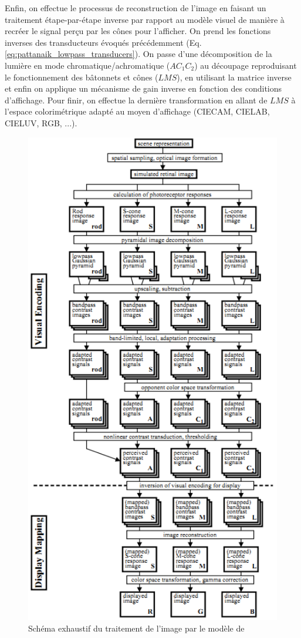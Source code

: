 	\par Enfin, on effectue le processus de reconstruction de l'image en faisant un traitement étape-par-étape inverse par rapport au modèle visuel de manière à recréer le signal perçu par les cônes pour l'afficher. On prend les fonctions inverses des transducteurs évoqués précédemment (Eq. \ref{eq:pattanaik_lowpass_transducers}). On passe d'une décomposition de la lumière en mode chromatique/achromatique ($AC_1C_2$) au découpage reproduisant le fonctionnement des bâtonnets et cônes ($LMS$), en utilisant la matrice inverse et enfin on applique un mécanisme de gain inverse en fonction des conditions d'affichage. Pour finir, on effectue la dernière transformation en allant de $LMS$ à l'espace colorimétrique adapté au moyen d'affichage (CIECAM, CIELAB, CIELUV, RGB, ...).
	
	\begin{figure}[h]
		\centering
		\includegraphics[scale=1.25]{Figures/PattanaikFullModel}
		\caption{Schéma exhaustif du traitement de l'image par le modèle de \cite{pattanaik_multiscale_1998}}
		\label{fig:full_model_pattanaik}
	\end{figure}
	

